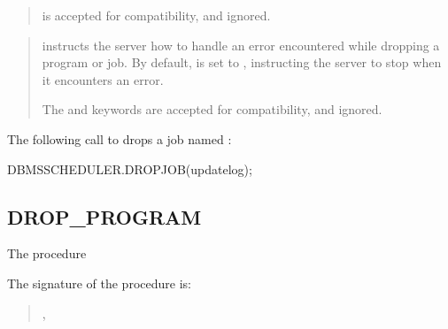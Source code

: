\documentclass[letterpaper,10pt,english,openany,oneside]{sphinxmanual}
\begin{document}
\begin{quote}

 is accepted for compatibility, and ignored.
\end{quote}

\begin{quote}

 instructs the server how to handle an error
encountered while dropping a program or job. By default,
 is set to , instructing
the server to stop when it encounters an error.

The  and  keywords are accepted for
compatibility, and ignored.
\end{quote}


The following call to  drops a job named :

%
\begin{sphinxVerbatim}[commandchars=\\\{\}]
DBMS\PYGZus{}SCHEDULER.DROP\PYGZus{}JOB(\PYGZsq{}update\PYGZus{}log\PYGZsq{});
\end{sphinxVerbatim}

\newpage


\subsection{DROP\_PROGRAM}
\label{\detokenize{drop_program::doc}}\label{\detokenize{drop_program:drop-program}}
The  procedure

The signature of the  procedure is:
\begin{quote}

\begin{DUlineblock}{0em}
\item[] 
\item[] ,
\item[] 
\end{DUlineblock}
\end{quote}
\end{document}
